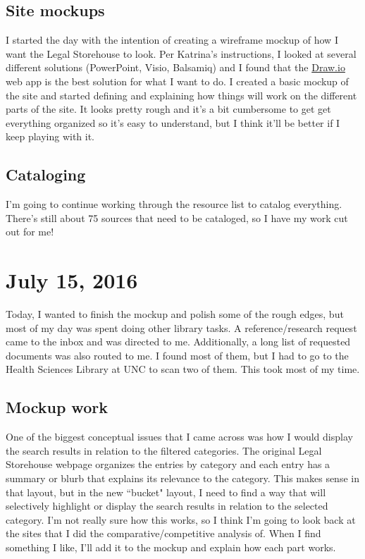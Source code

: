 \documentclass{article}
\begin{document}
\subsection{Site mockups}
I started the day with the intention of creating a wireframe mockup of how I want the Legal Storehouse to look. Per Katrina's instructions, I looked at several different solutions (PowerPoint, Visio, Balsamiq) and I found that the \href{http://draw.io/}{Draw.io} web app is the best solution for what I want to do. I created a basic mockup of the site and started defining and explaining how things will work on the different parts of the site. It looks pretty rough and it's a bit cumbersome to get get everything organized so it's easy to understand, but I think it'll be better if I keep playing with it.

\subsection{Cataloging}
I'm going to continue working through the resource list to catalog everything. There's still about 75 sources that need to be cataloged, so I have my work cut out for me!

\section{July 15, 2016}
Today, I wanted to finish the mockup and polish some of the rough edges, but most of my day was spent doing other library tasks. A reference/research request came to the inbox and was directed to me. Additionally, a long list of requested documents was also routed to me. I found most of them, but I had to go to the Health Sciences Library at UNC to scan two of them. This took most of my time.

\subsection{Mockup work}
One of the biggest conceptual issues that I came across was how I would display the search results in relation to the filtered categories. The original Legal Storehouse webpage organizes the entries by category and each entry has a summary or blurb that explains its relevance to the category. This makes sense in that layout, but in the new ``bucket" layout, I need to find a way that will selectively highlight or display the search results in relation to the selected category. I'm not really sure how this works, so I think I'm going to look back at the sites that I did the comparative/competitive analysis of. When I find something I like, I'll add it to the mockup and explain how each part works.
\end{document}
